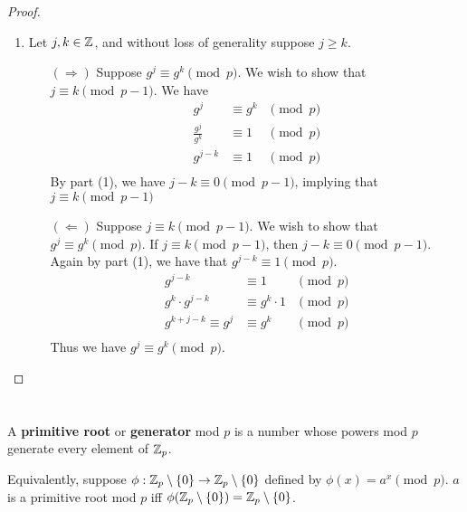 \documentclass[12pt]{article}
\begin{document}
\begin{proof}
\begin{enumerate}
            \item Let $j, k \in \mathbb{Z}$, and without loss of generality suppose $j \geq k$.
            \begin{itemize}
                \item[$(\Longrightarrow)$] Suppose $g^j \equiv g^k \pmod{p}$. We wish to show that $j \equiv k \pmod{p - 1}$. We have
                \begin{align*}
                    g^j &\equiv g^k &\pmod{p}\\
                    \frac{g^j}{g^k} &\equiv 1 &\pmod{p}\\
                    g^{j - k} &\equiv 1 &\pmod{p}\\
                \end{align*}
                By part (1), we have $j - k \equiv 0 \pmod{p - 1}$, implying that $j \equiv k \pmod{p - 1}$

                \item[$(\Longleftarrow)$] Suppose $j \equiv k \pmod{p - 1}$. We wish to show that $g^j \equiv g^k \pmod{p}$. If $j \equiv k \pmod{p - 1}$, then $j - k \equiv 0 \pmod{p - 1}$. Again by part (1), we have that $g^{j - k} \equiv 1 \pmod{p}$.
                \begin{align*}
                    g^{j - k} &\equiv 1 &\pmod{p}\\
                    g^k \cdot g^{j - k} &\equiv g^k \cdot 1 &\pmod{p}\\
                    g^{k + j - k} \equiv g^j &\equiv g^k &\pmod{p}\\
                \end{align*}
                Thus we have $g^j \equiv g^k \pmod{p}$.
            \end{itemize}
        \end{enumerate}
    \end{proof}

\section{}
    \subsection{}
        \begin{defn}
            A \textbf{primitive root} or \textbf{generator} mod $p$ is a number whose powers mod $p$ generate every element of $\mathbb{Z}_p$.

            Equivalently, suppose $\phi : \mathbb{Z}_p \setminus \{0\} \to \mathbb{Z}_p \setminus \{0\}$ defined by $\phi(x) = a^x \pmod{p}$. $a$ is a primitive root mod $p$ iff $\phi(\mathbb{Z}_p \setminus \{0\}) = \mathbb{Z}_p \setminus \{0\}$.
        \end{defn}
\end{document}
